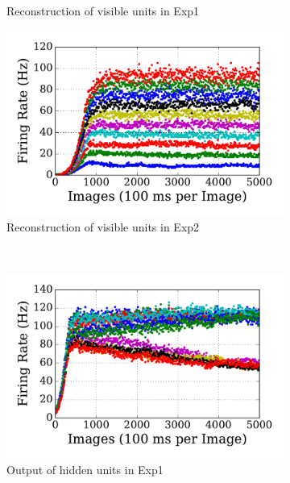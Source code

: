 \begin{figure}
\begin{subfigure}[t]{0.48\textwidth}
		\caption{Reconstruction of visible units in Exp1}
	\end{subfigure}
	\begin{subfigure}[t]{0.48\textwidth}
		\includegraphics[width=\textwidth]{pics_sdlm/17_exp_SRBM_all_long/exp2_recon_s.pdf}
		\caption{Reconstruction of visible units in Exp2}
	\end{subfigure}\\
	\begin{subfigure}[t]{0.48\textwidth}
		\includegraphics[width=\textwidth]{pics_sdlm/17_exp_SRBM_all_long/exp1_hid_s.pdf}
		\caption{Output of hidden units in Exp1}
	\end{subfigure}
	\begin{subfigure}[t]{0.48\textwidth}

\end{subfigure}
\end{figure}

